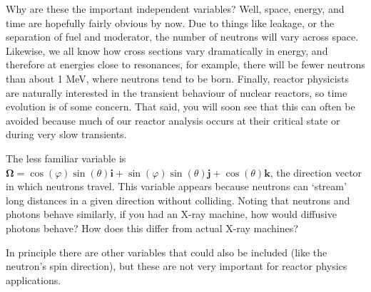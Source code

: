 \documentclass{article}
\begin{document}
Why are these the important independent variables? Well, space, energy, and time are hopefully fairly obvious by now. Due to things like leakage, or the separation of fuel and moderator, the number of neutrons will vary across space. Likewise, we all know how cross sections vary dramatically in energy, and therefore at energies close to resonances, for example, there will be fewer neutrons than about 1 MeV, where neutrons tend to be born. Finally, reactor physicists are naturally interested in the transient behaviour of nuclear reactors, so time evolution is of some concern. That said, you will soon see that this can often be avoided because much of our reactor analysis occurs at their critical state or during very slow transients.

The less familiar variable is $\mathbf{\Omega} = \cos(\varphi)\sin(\theta)\mathbf{i} + \sin(\varphi)\sin(\theta)\mathbf{j} + \cos(\theta)\mathbf{k}$, the direction vector in which neutrons travel. This variable appears because neutrons can `stream' long distances in a given direction without colliding. Noting that neutrons and photons behave similarly, if you had an X-ray machine, how would diffusive photons behave? How does this differ from actual X-ray machines?

In principle there are other variables that could also be included (like the neutron's spin direction), but these are not very important for reactor physics applications.
\end{document}
